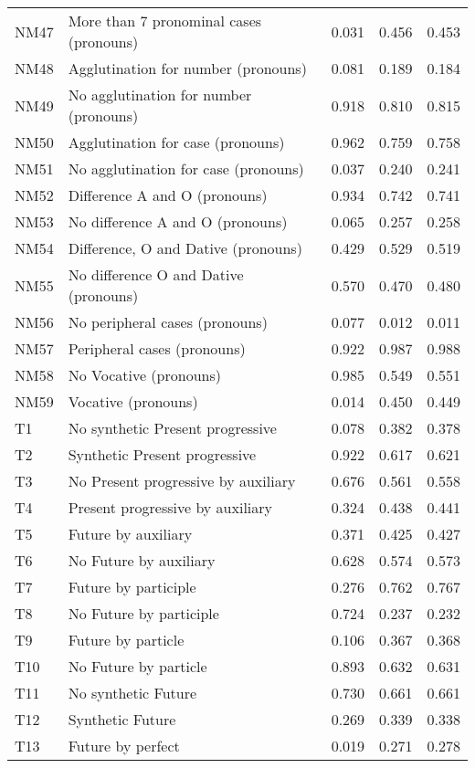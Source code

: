\begin{longtable}{lllll}
NM47 & More than 7 pronominal cases (pronouns) & 0.031 & 0.456 & 0.453\\
NM48 & Agglutination for number (pronouns) & 0.081 & 0.189 & 0.184\\
NM49 & No agglutination for number (pronouns) & 0.918 & 0.810 & 0.815\\
NM50 & Agglutination for case (pronouns) & 0.962 & 0.759 & 0.758\\
NM51 & No agglutination for case (pronouns) & 0.037 & 0.240 & 0.241\\
NM52 & Difference A and O (pronouns) & 0.934 & 0.742 & 0.741\\
NM53 & No difference A and O (pronouns) & 0.065 & 0.257 & 0.258\\
NM54 & Difference, O and Dative (pronouns) & 0.429 & 0.529 & 0.519\\
NM55 & No difference O and Dative (pronouns) & 0.570 & 0.470 & 0.480\\
NM56 & No peripheral cases (pronouns) & 0.077 & 0.012 & 0.011\\
NM57 & Peripheral cases (pronouns) & 0.922 & 0.987 & 0.988\\
NM58 & No Vocative (pronouns) & 0.985 & 0.549 & 0.551\\
NM59 & Vocative (pronouns) & 0.014 & 0.450 & 0.449\\
T1 & No synthetic Present progressive & 0.078 & 0.382 & 0.378\\
T2 & Synthetic Present progressive & 0.922 & 0.617 & 0.621\\
T3 & No Present progressive by auxiliary & 0.676 & 0.561 & 0.558\\
T4 & Present progressive by auxiliary & 0.324 & 0.438 & 0.441\\
T5 & Future by auxiliary & 0.371 & 0.425 & 0.427\\
T6 & No Future by auxiliary & 0.628 & 0.574 & 0.573\\
T7 & Future by participle & 0.276 & 0.762 & 0.767\\
T8 & No Future by participle & 0.724 & 0.237 & 0.232\\
T9 & Future by particle & 0.106 & 0.367 & 0.368\\
T10 & No Future by particle & 0.893 & 0.632 & 0.631\\
T11 & No synthetic Future & 0.730 & 0.661 & 0.661\\
T12 & Synthetic Future & 0.269 & 0.339 & 0.338\\
T13 & Future by perfect & 0.019 & 0.271 & 0.278\\

\end{longtable}
